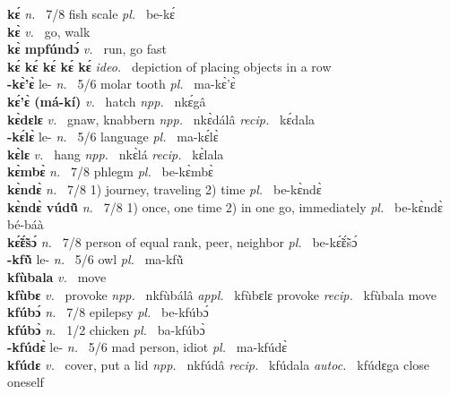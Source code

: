 {\bfseries kɛ́}  {\itshape n.~} 7/8 fish scale {\itshape pl.~} be-kɛ́    \\ 
{\bfseries kɛ̀}  {\itshape v.~} go, walk    \\ 
{\bfseries kɛ̀ mpfúndɔ́}  {\itshape v.~} run, go fast    \\ 
{\bfseries kɛ́ kɛ́ kɛ́ kɛ́ kɛ́}  {\itshape ideo.~} depiction of placing objects in a row    \\ 
{\bfseries -kɛ̀'ɛ̀} le- {\itshape n.~} 5/6 molar tooth {\itshape pl.~} ma-kɛ̀'ɛ̀    \\ 
{\bfseries kɛ́'ɛ̀ (má-kí)}  {\itshape v.~} hatch   {\itshape npp.~} nkɛ́gâ  \\ 
{\bfseries kɛ̀dɛlɛ}  {\itshape v.~} gnaw, knabbern   {\itshape npp.~} nkɛ̀dálâ {\itshape recip.~} kɛ́dala  \\ 
{\bfseries -kɛ́lɛ̀} le- {\itshape n.~} 5/6 language {\itshape pl.~} ma-kɛ́lɛ̀    \\ 
{\bfseries kɛ̀lɛ}  {\itshape v.~} hang   {\itshape npp.~} nkɛ̀lá {\itshape recip.~} kɛ̀lala  \\ 
{\bfseries kɛ̀mbɛ̀}  {\itshape n.~} 7/8 phlegm {\itshape pl.~} be-kɛ̀mbɛ̀    \\ 
{\bfseries kɛ̀ndɛ̀}  {\itshape n.~} 7/8 1) journey, traveling 2) time {\itshape pl.~} be-kɛ̀ndɛ̀    \\ 
{\bfseries kɛ̀ndɛ̀ vúdũ̂}  {\itshape n.~} 7/8 1) once, one time 2) in one go, immediately {\itshape pl.~} be-kɛ̀ndɛ̀ bé-báà    \\ 
{\bfseries kɛ̃́ɛ̃́sɔ́}  {\itshape n.~} 7/8 person of equal rank, peer, neighbor {\itshape pl.~} be-kɛ̃́ɛ̃́sɔ́    \\ 
{\bfseries -kfũ̀} le- {\itshape n.~} 5/6 owl {\itshape pl.~} ma-kfũ̀    \\ 
{\bfseries kfùbala}  {\itshape v.~} move    \\ 
{\bfseries kfùbɛ}  {\itshape v.~} provoke   {\itshape npp.~} nkfùbálâ {\itshape appl.~} kfùbɛlɛ provoke {\itshape recip.~} kfùbala move  \\ 
{\bfseries kfúbɔ́}  {\itshape n.~} 7/8 epilepsy {\itshape pl.~} be-kfúbɔ́    \\ 
{\bfseries kfúbɔ̀}  {\itshape n.~} 1/2 chicken {\itshape pl.~} ba-kfúbɔ̀    \\ 
{\bfseries -kfúdɛ̀} le- {\itshape n.~} 5/6 mad person, idiot {\itshape pl.~} ma-kfúdɛ̀    \\ 
{\bfseries kfúdɛ}  {\itshape v.~} cover, put a lid   {\itshape npp.~} nkfúdâ {\itshape recip.~} kfúdala {\itshape autoc.~} kfúdɛga close oneself  \\ 
